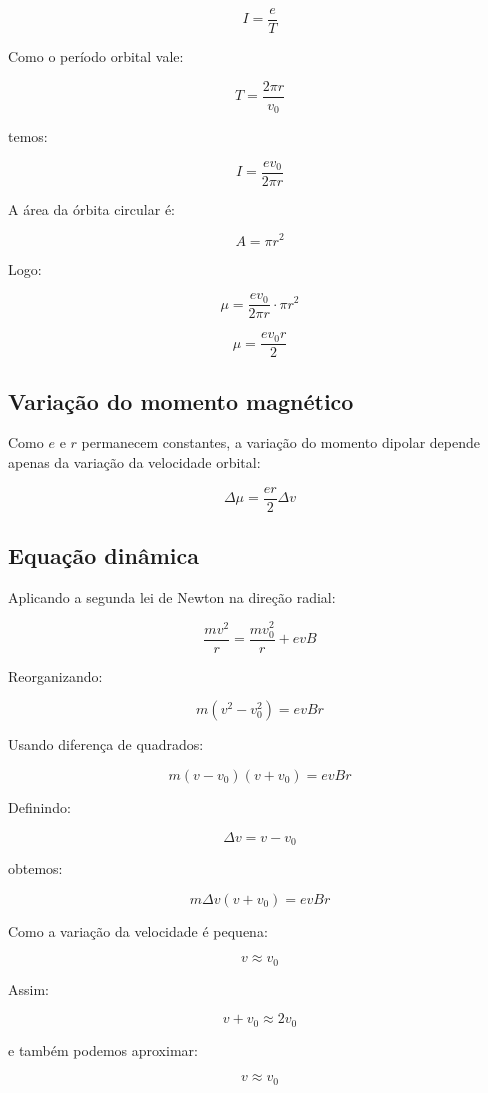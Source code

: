 \documentclass[12pt,a4paper]{article}
\begin{document}
\[
I=\frac{e}{T}
\]

Como o período orbital vale:

\[
T=\frac{2\pi r}{v_0}
\]

temos:

\[
I=\frac{ev_0}{2\pi r}
\]

A área da órbita circular é:

\[
A=\pi r^2
\]

Logo:

\[
\mu = \frac{ev_0}{2\pi r}\cdot\pi r^2
\]

\[
\mu = \frac{ev_0r}{2}
\]


\subsection*{Variação do momento magnético}

Como $e$ e $r$ permanecem constantes, a variação do momento
dipolar depende apenas da variação da velocidade orbital:

\[
\Delta\mu = \frac{er}{2}\Delta v
\]


\subsection*{Equação dinâmica}

Aplicando a segunda lei de Newton na direção radial:

\[
\frac{mv^2}{r}
=
\frac{mv_0^2}{r}+evB
\]

Reorganizando:

\[
m(v^2-v_0^2)=evBr
\]

Usando diferença de quadrados:

\[
m(v-v_0)(v+v_0)=evBr
\]

Definindo:

\[
\Delta v = v-v_0
\]

obtemos:

\[
m\Delta v (v+v_0)=evBr
\]

Como a variação da velocidade é pequena:

\[
v\approx v_0
\]

Assim:

\[
v+v_0 \approx 2v_0
\]

e também podemos aproximar:

\[
v\approx v_0
\]
\end{document}
